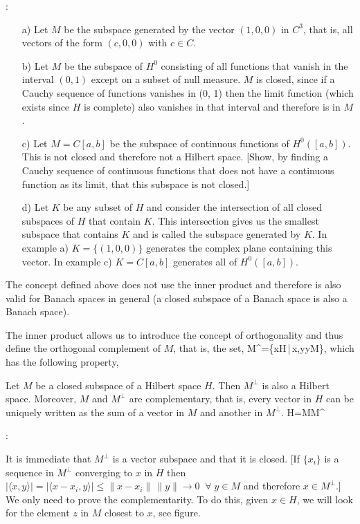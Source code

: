\noi {}:
\begin{itemize}
\item[a)] 
Let $M$ be the subspace generated by the vector $(1, 0, 0)$ in $C^3$, that is, all vectors of the form $(c, 0, 0)$ with $c\in C$.

\item[b)] 
Let $M$ be the subspace of $H^0$ consisting of all functions that vanish in the interval $(0, 1)$ except on a subset of null measure. $M$ is closed, since if a Cauchy sequence of functions vanishes in (0, 1) then the limit function (which exists since $H$ is complete) also vanishes in that interval and therefore is in $M$.

\item[c)] 
Let $M=C[a,b]$ be the subspace of continuous functions of $H^0([a,b])$. This is not closed and therefore not a Hilbert space.
[Show, by finding a Cauchy sequence of continuous functions that does not have a continuous function as its limit, that this subspace is not closed.]

\item[d)] 
Let $K$ be any subset of $H$ and consider the intersection of all closed subspaces of $H$ that contain $K$. This intersection gives us the smallest subspace that contains $K$ and is called the subspace generated by $K$. 
In example a) $K=\{(1,0,0)\}$ generates the complex plane containing this vector.
In example c) $K=C[a,b]$
generates all of $H^0([a,b])$.

\end{itemize}

The concept defined above does not use the inner product and therefore is also valid for Banach spaces in general (a closed subspace of a Banach space is also a Banach space). 

The inner product allows us to introduce the concept of orthogonality and thus define the orthogonal complement of $M$, that is, the set,
\beq
M^{\perp}=\{x\in H\,|\,\langle x,y\;\forall\;y\in M\},
\eeq
which has the following property,

\bteo
 Let $M$ be a closed subspace of a Hilbert space $H$.
Then $M^{\perp}$ is also a Hilbert space. Moreover, $M$ and $M^{\perp}$ are complementary, that is, every vector in $H$ can be uniquely written as the sum of a vector in $M$ and another in $M^{\perp}$.
\beq
H=M\oplus M^{\perp}
\eeq
\eteo

\pru:

It is immediate that $M^{\perp}$ is a vector subspace and that it is closed.
[If $\{x_i\}$ is a sequence in $M^{\perp}$ converging to $x$ in $H$ then
$|\langle x,y\rangle|=|\langle x-x_i,y\rangle|\leq\|x-x_i\|\,\|y\|\to 0\;\;\forall \; y \in M$
 and therefore $x\in M^{\perp}$.]
We only need to prove the complementarity. To do this, given $x\in H$,
we will look for the element $z$ in $M$ closest to $x$, see figure.

